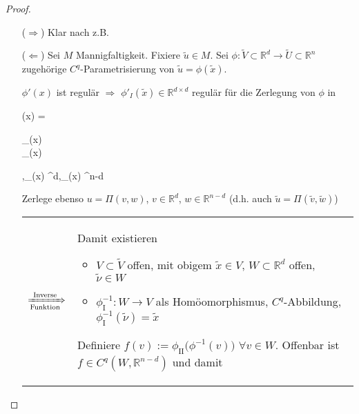 \begin{proof}\hspace*{0pt}
	\vspace*{\dimexpr-\baselineskip+1mm\relax}
	\begin{itemize}
		\item[($\Rightarrow$)] Klar nach z.B. 
		\item[($\Leftarrow$)] Sei $M$ Mannigfaltigkeit. Fixiere $\tilde{u}\in M$. Sei $\phi\colon\tilde{V}\subset \mathbb{R}^d \to \tilde{U}\subset \mathbb{R}^n$ zugehörige $C^q$-Parametrisierung von $\tilde{u} = \phi(\tilde{x})$.
		
		$\phi'(x)$ ist regulär $\Rightarrow$ $\phi'_I (\tilde{x}) \in \mathbb{R}^{d\times d}$ regulär für die Zerlegung von $\phi$ in\begin{flalign*}
			\phi(x) = \Pi \begin{pmatrix} \phi_{}(x) \\ \phi_{}(x)\end{pmatrix},\quad \phi_{}(x) \in {}^d,\quad \phi_{}(x) \in {}^{n-d}
		\end{flalign*}
		
		Zerlege ebenso $u = \Pi(v,w)$, $v\in \mathbb{R}^{d}$, $w\in \mathbb{R}^{n-d}$ (d.h. auch $\tilde{u} = \Pi(\tilde{v}, \tilde{w})$)\par
		\begin{tabularx}{\linewidth}{r@{\ }X}
			$\xRightarrow[\text{Funktion}]{\text{Inverse}}$ &
			Damit existieren\par
			\begin{minipage}[t]{\linewidth}
				\begin{itemize}
					\item $V\subset \tilde{V}$ offen, mit obigem $\tilde{x} \in V$, $W\subset \mathbb{R}^d$ offen, $\tilde{\nu}\in W$
					\item $\phi^{-1}_{\text{I}}\colon W\to V$ als Homöomorphismus, $C^q$-Abbildung, $\phi_{\text{I}}^{-1}(\tilde{\nu}) = \tilde{x}$
				\end{itemize}
			\end{minipage}
			\vspace*{1mm}
			
			Definiere $f(v) := \phi_{\text{II}}\big(\phi^{-1}(v)\big)$ $\forall v\in W$. Offenbar ist $f\in C^q(W, \mathbb{R}^{n-d})$ und damit
			

\end{tabularx}
\end{itemize}
\end{proof}
